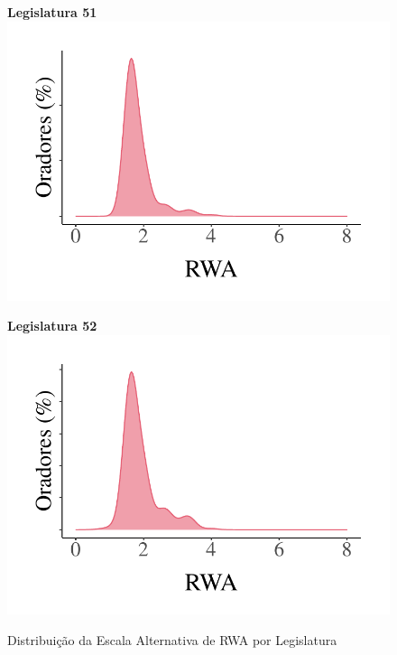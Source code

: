 \documentclass[
12pt,				%
openright,			%
twoside,			%
a4paper,			%
english,			%
french,				%
spanish,			%
brazil				%
]{abntex2}
\begin{document}
\begin{figure}[!htb]
	\caption{Distribuição da Escala Alternativa de RWA por Legislatura}
	\centering
	
	\hspace{.05\linewidth}
	\begin{minipage}[b]{0.3\textwidth}
		\textbf{Legislatura 51}
		\label{fig:dense_rwa_51}
		\centering
		\includegraphics[width=1\linewidth]{figures/dense_rwa_51}
		
	\end{minipage}
	\hspace{.05\linewidth}
	\begin{minipage}[b]{0.3\textwidth}
		\textbf{Legislatura 52}
		\label{fig:dense_rwa_52}
		\centering
		\includegraphics[width=1\linewidth]{figures/dense_rwa_52}
		

\end{minipage}
\end{figure}
\end{document}
